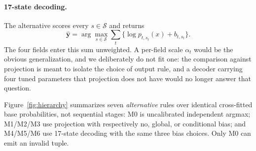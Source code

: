 \paragraph{17-state decoding.}
The alternative scores every $s\in\mathcal S$ and returns
\begin{equation}
  \hat{\mathbf y}=\arg\max_{s\in\mathcal S}
  \sum_t \{\log p_{t,s_t}(x)+b_{t,s_t}\}.
  \label{eq:joint-decoder}
\end{equation}
The four fields enter this sum unweighted. A per-field scale $\alpha_t$ would
be the obvious generalization, and we deliberately do not fit one: the
comparison against projection is meant to isolate the choice of output rule,
and a decoder carrying four tuned parameters that projection does not have
would no longer answer that question.

Figure~\ref{fig:hierarchy} summarizes seven \emph{alternative} rules over
identical cross-fitted base probabilities, not sequential stages: M0 is
uncalibrated independent argmax; M1/M2/M3 use projection with respectively no,
global, or conditional bias; and M4/M5/M6 use 17-state decoding with the same
three bias choices. Only M0 can emit an invalid tuple.
